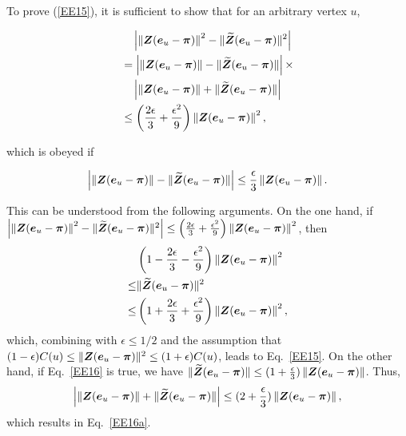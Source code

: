\documentclass[10pt,journal,compsoc,twocolumn,twoside]{IEEEtran}
\begin{document}
\begin{IEEEproof}
    To prove (\ref{EE15}), it is sufficient  to show that for an arbitrary vertex \(u\),
    \begin{small}
        \begin{align}\label{EE16a}
             & \quad \left|\left\Vert\boldsymbol{Z}(\boldsymbol{e}_u-\boldsymbol{\pi})\right\Vert^2-\|{\widetilde{\boldsymbol{Z}}(\boldsymbol{e}_u-\boldsymbol{\pi})}\|^2 \right|\nonumber \\
             & =
            \left|\left\Vert\boldsymbol{Z}(\boldsymbol{e}_u-\boldsymbol{\pi})\right\Vert-\|\widetilde{\boldsymbol{Z}}(\boldsymbol{e}_u-\boldsymbol{\pi})\| \right|\times \nonumber         \\
             & \quad\left|\left\Vert\boldsymbol{Z}(\boldsymbol{e}_u-\boldsymbol{\pi})\right\Vert+\|\widetilde{\boldsymbol{Z}}(\boldsymbol{e}_u-\boldsymbol{\pi})\| \right| \nonumber       \\
             & \le
            \left(\frac{2\epsilon}{3}+\frac{\epsilon^2}{9}\right)\left\Vert\boldsymbol{Z}(\boldsymbol{e}_u-\boldsymbol{\pi})\right\Vert^2,
        \end{align}
    \end{small}
    which is obeyed if
    \begin{small}
        \begin{equation}\label{EE16}
            \left|\left\Vert\boldsymbol{Z}(\boldsymbol{e}_u-\boldsymbol{\pi})\right\Vert-\|\widetilde{\boldsymbol{Z}}(\boldsymbol{e}_u-\boldsymbol{\pi})\| \right| \le
            \frac{\epsilon}{3}\left\Vert\boldsymbol{Z}(\boldsymbol{e}_u-\boldsymbol{\pi})\right\Vert.
        \end{equation}
    \end{small}
    This can be understood from the following arguments. On the one hand, if
    {\footnotesize \(\left|\left\Vert\boldsymbol{Z}(\boldsymbol{e}_u-\boldsymbol{\pi})\right\Vert^2-\|{\widetilde{\boldsymbol{Z}}(\boldsymbol{e}_u-\boldsymbol{\pi})}\|^2 \right| \le \left(\frac{2\epsilon}{3}+\frac{\epsilon^2}{9}\right)\left\Vert\boldsymbol{Z}(\boldsymbol{e}_u-\boldsymbol{\pi})\right\Vert^2\)}, then
    \begin{align*}
            & \left(1-\frac{2\epsilon}{3}-\frac{\epsilon^2}{9}\right)\left\Vert\boldsymbol{Z}(\boldsymbol{e}_u-\boldsymbol{\pi})\right\Vert^2  \\
        \le & \|{\widetilde{\boldsymbol{Z}}(\boldsymbol{e}_u-\boldsymbol{\pi})}\|^2                                                      \\
        \le & \left(1+\frac{2\epsilon}{3}+\frac{\epsilon^2}{9}\right)\left\Vert\boldsymbol{Z}(\boldsymbol{e}_u-\boldsymbol{\pi})\right\Vert^2,
    \end{align*}
    which, combining with \(\epsilon \le 1/2\) and the assumption that \((1-\epsilon) C(u)\leq\|\boldsymbol{Z} (\boldsymbol{e}_{u} - \boldsymbol{\pi})\|^{2}\leq(1+\epsilon)  C(u)\), leads to Eq.~\eqref{EE15}.
    On the other hand, if Eq.~\eqref{EE16} is true, we have \(\|\widetilde{\boldsymbol{Z}}(\boldsymbol{e}_u-\boldsymbol{\pi})\| \le (1+\frac{\epsilon}{3})\left\Vert\boldsymbol{Z}(\boldsymbol{e}_u-\boldsymbol{\pi})\right\Vert\). Thus,
    \begin{equation*}
        \left|\left\Vert\boldsymbol{Z}(\boldsymbol{e}_u-\boldsymbol{\pi})\right\Vert+\|\widetilde{\boldsymbol{Z}}(\boldsymbol{e}_u-\boldsymbol{\pi})\| \right| \le (2+\frac{\epsilon}{3})\left\Vert\boldsymbol{Z}(\boldsymbol{e}_u-\boldsymbol{\pi})\right\Vert,
    \end{equation*}
    which results in Eq.~\eqref{EE16a}.


\end{IEEEproof}
\end{document}
